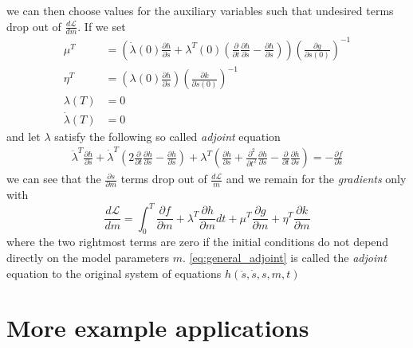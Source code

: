 \documentclass[10pt]{SelfArx} %
\newcommand{\pder}[2][]{\frac{\partial#1}{\partial#2}}
\newcommand{\ppder}[2][]{\frac{\partial^2#1}{\partial#2^2}}
\theoremstyle{definition}
\begin{document}
we can then choose values for the auxiliary variables such that undesired terms drop out of $\frac{d\mathcal{L}}{dm}$. If we set 
\begin{equation}
\begin{aligned}
\mu^T &= \left(\dot \lambda(0) \pder[h]{\ddot s} + \lambda^T(0)\left(\pder{t} \pder[h]{\ddot s} - \pder[h]{\dot s} \right)\right) \left(\pder[g]{s(0)}\right)^{-1} \\
\eta^T &= \left(\lambda(0) \pder[h]{\ddot s} \right)\left(\pder[k]{\dot s(0)}\right)^{-1}\\
\lambda(T) & = 0\\
\dot \lambda(T) &= 0
\end{aligned}
\end{equation}
and let $\lambda$ satisfy the following so called \emph{adjoint} equation 
\begin{equation}
\label{eq:general_adjoint}
\begin{aligned}
\ddot \lambda^T \pder[h]{\ddot s} + \dot \lambda^T \left(2\pder{t}\pder[h]{\ddot s} - \pder[h]{\dot s} \right)
 + \lambda^T\left(\pder[h]{s} + \ppder{t}\pder[h]{\ddot s} -\pder{t}\pder[h]{\dot s}\right) = -\pder[f]{s}
\end{aligned}
\end{equation}
we can see that the $\pder[s]{m}$ terms drop out of $\frac{d\mathcal{L}}{m}$ and we remain for the \emph{gradients} only with
\begin{equation}\label{eq:general_gradient}
\frac{d\mathcal{L}}{dm} =\int_0^T \pder[f]{m} + \lambda^T \pder[h]{m} dt + \mu^T \pder[g]{m} + \eta^T \pder[k]{m}
\end{equation} 
where the two rightmost terms are zero if the initial conditions do not depend directly on the model parameters $m$. \cref{eq:general_adjoint} is called the \emph{adjoint} equation to the original system of equations $h\left(\ddot s, \dot s, s, m, t\right)$

\section{More example applications}\label{sec:examples}
\end{document}
